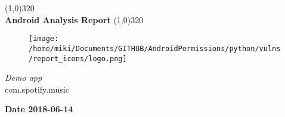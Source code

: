 \documentclass[12p]{article}
\begin{document}
\begin{titlepage}
\begin{center}
\line(1,0){320}\\
[0.25in]
\huge{\bfseries Android Analysis Report}
\line(1,0){320}\\
[0.5in]
\begin{figure}[H]
	\centering
	\texttt{[image: /home/miki/Documents/GITHUB/AndroidPermissions/python/vulns/report\_icons/logo.png]}
\end{figure}
\textsl{\LARGE Demo app}\\
\textsf{\LARGE com.spotify.music}\\
[2.5in]
\end{center}
\begin{flushright}
\textbf{\large Date 2018-06-14}
\end{flushright}
\end{titlepage}
\tableofcontents
\thispagestyle{empty}
\cleardoublepage
\setcounter{page}{1}
\end{document}
